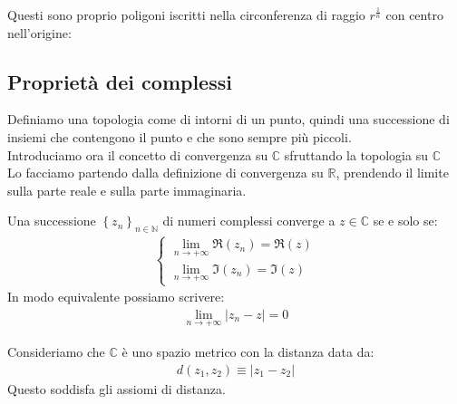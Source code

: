 \documentclass[a4paper, oneside]{article}
\begin{document}
    Questi sono proprio poligoni iscritti nella circonferenza di raggio $r^{\frac{1}{n}}$ con centro nell'origine:
    \begin{center}
    \end{center}
    \subsection{Proprietà dei complessi}
    Definiamo una topologia come di intorni di un punto, quindi una successione di insiemi che contengono il punto e che sono sempre più piccoli.\\
    Introduciamo ora il concetto di convergenza su $\mathbb{C}$ sfruttando la topologia su $\mathbb{C}$\\
    Lo facciamo partendo dalla definizione di convergenza su $\mathbb{R}$, prendendo il limite sulla parte reale e sulla parte immaginaria.
    \begin{definition}
        Una successione $\left\{z_n\right\} _{n \in \mathbb{N}}$ di numeri complessi converge a $z \in \mathbb{C}$ se e solo se:
        \begin{gather*}
            \begin{cases}
                \lim_{n \to +\infty} \Re(z_n) = \Re(z)\\
                \lim_{n \to +\infty} \Im(z_n) = \Im(z)
            \end{cases}
        \end{gather*}
        In modo equivalente possiamo scrivere:
        \begin{gather*}
            \lim_{n \to +\infty}\left\lvert  z_n -z \right\rvert = 0 
        \end{gather*}
    \end{definition}
    \noindent
    Consideriamo che $\mathbb{C}$ è uno spazio metrico con la distanza data da:
    \begin{gather*}
        d(z_1, z_2) \equiv |z_1 - z_2|
    \end{gather*}
    Questo soddisfa gli assiomi di distanza.\\
    \hfill\\
\end{document}
